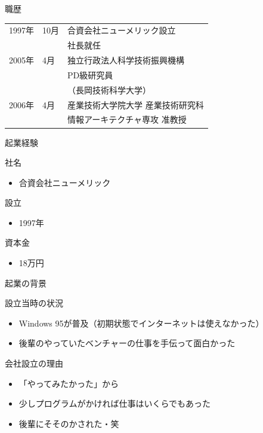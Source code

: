 \documentclass[t, aspectratio=169]{beamer}
\begin{document}
\begin{frame}[label=sec-1-1-4]{職歴}
\begin{center}
\begin{tabular}{lll}
1997年 & 10月 & 合資会社ニューメリック設立\\
 &  & \alert{社長就任}\\
2005年 & 4月 & 独立行政法人科学技術振興機構\\
 &  & PD級研究員\\
 &  & （長岡技術科学大学）\\
2006年 & 4月 & 産業技術大学院大学 産業技術研究科\\
 &  & 情報アーキテクチャ専攻 准教授\\
\end{tabular}
\end{center}
\end{frame}
\begin{frame}[label=sec-1-1-5]{起業経験}
\begin{block}{社名}
\begin{itemize}
\item 合資会社ニューメリック
\end{itemize}
\end{block}
\begin{block}{設立}
\begin{itemize}
\item 1997年
\end{itemize}
\end{block}
\begin{block}{資本金}
\begin{itemize}
\item \alert{18万円}
\end{itemize}
\end{block}
\end{frame}
\begin{frame}[label=sec-1-1-6]{起業の背景}
\begin{block}{設立当時の状況}
\begin{itemize}
\item Windows 95が普及（初期状態でインターネットは使えなかった）
\item 後輩のやっていたベンチャーの仕事を手伝って面白かった
\end{itemize}
\end{block}
\begin{block}{会社設立の理由}
\begin{itemize}
\item 「やってみたかった」から
\item 少しプログラムがかければ仕事はいくらでもあった
\item 後輩にそそのかされた・笑
\end{itemize}
\end{block}
\end{frame}
\end{document}
